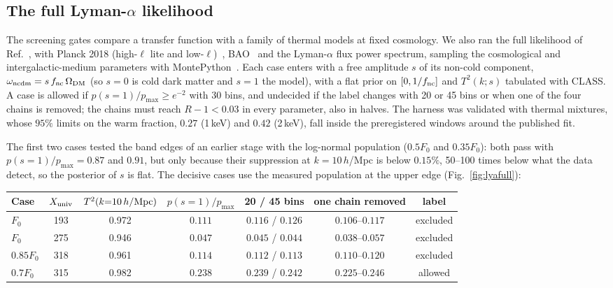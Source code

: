 \documentclass[11pt,a4paper]{article}
\newcommand{\Xu}{X_{\rm univ}}
\begin{document}
\subsection{The full Lyman-$\alpha$ likelihood}
\label{sec:lyafull}

The screening gates compare a transfer function with a family of thermal models at fixed cosmology.
We also ran the full likelihood of Ref.~\cite{Hooper2022}, with Planck 2018 (high-$\ell$ lite and low-$\ell$)~\cite{Planck2018V}, BAO~\cite{Alam2017} and the Lyman-$\alpha$ flux power spectrum, sampling the cosmological and intergalactic-medium parameters with MontePython~\cite{MontePython2019}.
Each case enters with a free amplitude $s$ of its non-cold component, $\omega_{\rm ncdm}=s\,f_{\rm nc}\,\Omega_{\rm DM}$ (so $s=0$ is cold dark matter and $s=1$ the model), with a flat prior on $[0,1/f_{\rm nc}]$ and $T^2(k;s)$ tabulated with CLASS.
A case is allowed if $p(s=1)/p_{\max}\ge e^{-2}$ with 30 bins, and undecided if the label changes with 20 or 45 bins or when one of the four chains is removed; the chains must reach $R-1<0.03$ in every parameter, also in halves.
The harness was validated with thermal mixtures, whose $95\%$ limits on the warm fraction, $0.27$ (1\,keV) and $0.42$ (2\,keV), fall inside the preregistered windows around the published fit.

The first two cases tested the band edges of an earlier stage with the log-normal population ($0.5F_0$ and $0.35F_0$): both pass with $p(s=1)/p_{\max}=0.87$ and $0.91$, but only because their suppression at $k=10\,h$/Mpc is below $0.15\%$, 50--100 times below what the data detect, so the posterior of $s$ is flat.
The decisive cases use the measured population at the upper edge (Fig.~\ref{fig:lyafull}):

\begin{table}[h]
\centering\small
\begin{tabular}{lcccccc}
\toprule
Case & $\Xu$ & $T^2(k{=}10\,h/{\rm Mpc})$ & $p(s{=}1)/p_{\max}$ & 20 / 45 bins & one chain removed & label\\
\midrule
$F_0$ & 193 & 0.972 & $0.111$ & $0.116$ / $0.126$ & $0.106$--$0.117$ & excluded\\
$F_0$ & 275 & 0.946 & $0.047$ & $0.045$ / $0.044$ & $0.038$--$0.057$ & excluded\\
$0.85F_0$ & 318 & 0.961 & $0.114$ & $0.112$ / $0.113$ & $0.110$--$0.120$ & excluded\\
$0.7F_0$ & 315 & 0.982 & $0.238$ & $0.239$ / $0.242$ & $0.225$--$0.246$ & allowed\\
\bottomrule
\end{tabular}
\end{table}
\end{document}
